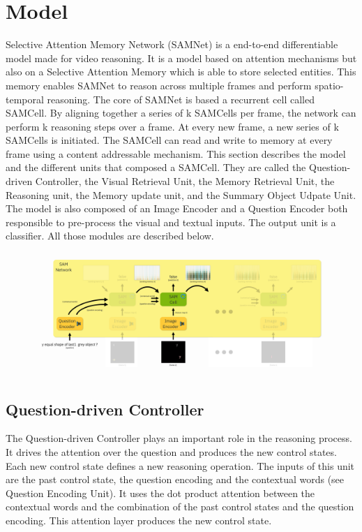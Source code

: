 \section{Model}

Selective Attention Memory Network (SAMNet) is a end-to-end differentiable model made for video reasoning. It is a model based on attention mechanisms but also on a Selective Attention Memory which is able to store selected entities. This memory enables SAMNet to reason across multiple frames and perform spatio-temporal reasoning. 
The core of SAMNet is based a recurrent cell called SAMCell. By aligning together a series of k SAMCells per frame, the network can perform k reasoning steps over a frame. At every new frame, a new series of k SAMCells is initiated. The SAMCell can read and write to memory at every frame using a content addressable mechanism. This section describes the model and the different units that composed a SAMCell. They are called the Question-driven Controller, the Visual Retrieval Unit, the Memory Retrieval Unit, the Reasoning unit, the Memory update unit, and the Summary Object Udpate Unit. 
The model is also composed of an Image Encoder and a Question Encoder both responsible to pre-process the visual and textual inputs. The output unit is a classifier.
All those modules are described below.


\begin{figure}
	\centering
	\includegraphics[width=1\linewidth]{../img/architecture/samnet_architecture}
	\caption{}
	\label{fig:samnetarchitecture}
\end{figure}
	
	

\subsection{Question-driven Controller}

The Question-driven Controller plays an important role in the reasoning process.
It drives the attention over the question and produces the new control states. Each new control state defines a new reasoning operation. The inputs of this unit are the past control state, the question encoding and the contextual words (see Question Encoding Unit). It uses the dot product attention between the contextual words
and the combination of the past control states and the question encoding.  This attention layer produces the new control state.

